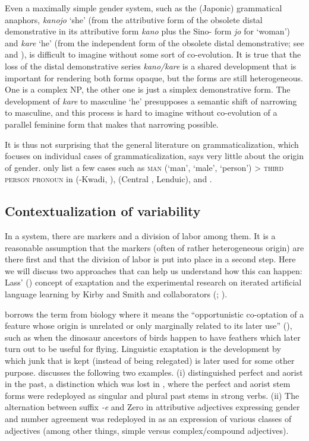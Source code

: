 \documentclass[output=collectionpaper]{langsci/langscibook}
\begin{document}
Even a maximally simple gender system, such as the  (Japonic) grammatical anaphors, \textit{kanojo} `she' (from the attributive form of the obsolete distal demonstrative in its attributive form \textit{kano} plus the Sino- form \textit{jo} for `woman') and \textit{kare} `he' (from the independent form of the obsolete distal demonstrative; see \citealt{Ishiyama2008} and ), is difficult to imagine without some sort of co-evolution. It is true that the loss of the distal demonstrative series \textit{kano/kare} is a shared development that is important for rendering both forms opaque, but the forms are still heterogeneous. One is a complex NP, the other one is just a simplex demonstrative form. The development of \textit{kare} to masculine `he' presupposes a semantic shift of narrowing to masculine, and this process is hard to imagine without co-evolution of a parallel feminine form that makes that narrowing possible.

It is thus not surprising that the general literature on grammaticalization, which focuses on individual cases of grammaticalization, says very little about the origin of gender. \cite{Heine2002} only list a few cases such as \textsc{man} (`man', `male', `person') > \textsc{third person pronoun} in  (-Kwadi, ),  (Central , Lenduic), and .


  \subsection{Contextualization of variability}
  \label{sec:WDG:10.3}

In a system, there are markers and a division of labor among them. It is a reasonable assumption that the markers (often of rather heterogeneous origin) are there first and that the division of labor is put into place in a second step. Here we will discuss two approaches that can help us understand how this can happen: Lass' (\citeyear*{Lass1990}) concept of exaptation and the experimental research on iterated artificial language learning by Kirby and Smith and collaborators (\citealt{Kirby2008}; \citealt{Smith2010}).

\cite{Lass1990} borrows the term  from biology where it means the ``opportunistic co-optation of a feature whose origin is unrelated or only marginally related to its later use'' (\citealt[80]{Lass1990}), such as when the dinosaur ancestors of birds happen to have feathers which later turn out to be useful for flying. Linguistic exaptation is the development by which junk that is kept (instead of being relegated) is later used for some other purpose. \cite{Lass1990} discusses the following two examples. (i)  distinguished perfect and aorist in the past, a distinction which was lost in , where the perfect and aorist stem forms were redeployed as singular and plural past stems in strong verbs. (ii) The  alternation between suffix \textit{-e} and Zero in attributive adjectives expressing gender and number agreement was redeployed in  as an expression of various classes of adjectives (among other things, simple versus complex/compound adjectives).
\end{document}
